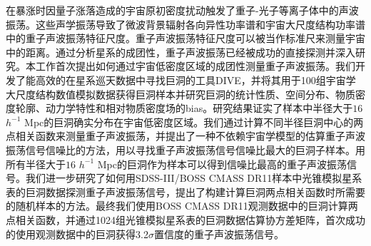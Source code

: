 \begin{cabstract}
  在暴涨时因量子涨落造成的宇宙原初密度扰动触发了重子-光子等离子体中的声波振荡。这些声学振荡导致了微波背景辐射各向异性功率谱和宇宙大尺度结构功率谱中的重子声波振荡特征尺度。重子声波振荡特征尺度可以被当作标准尺来测量宇宙中的距离。通过分析星系的成团性，重子声波振荡已经被成功的直接探测并深入研究。本工作首次提出如何通过宇宙低密度区域的成团性测量重子声波振荡。我们开发了能高效的在星系巡天数据中寻找巨洞的工具DIVE，并将其用于100组宇宙学大尺度结构数值模拟数据获得巨洞样本并研究巨洞的统计性质、空间分布、物质密度轮廓、动力学特性和相对物质密度场的bias。研究结果证实了样本中半径大于$16$ $h^{-1}$ Mpc的巨洞确实分布在宇宙低密度区域。我们通过计算不同半径巨洞中心的两点相关函数来测量重子声波振荡，并提出了一种不依赖宇宙学模型的估算重子声波振荡信号信噪比的方法，用以寻找重子声波振荡信号信噪比最大的巨洞子样本。用所有半径大于$16$ $h^{-1}$ Mpc的巨洞作为样本可以得到信噪比最高的重子声波振荡信号。我们进一步研究了如何用SDSS-III/BOSS CMASS DR11样本中光锥模拟星系表的巨洞数据探测重子声波振荡信号，提出了构建计算巨洞两点相关函数时所需要的随机样本的方法。最终我们使用BOSS CMASS DR11观测数据中的巨洞计算两点相关函数，并通过1024组光锥模拟星系表的巨洞数据估算协方差矩阵，首次成功的使用观测数据中的巨洞获得3.2$\sigma$置信度的重子声波振荡信号。
\end{cabstract}


